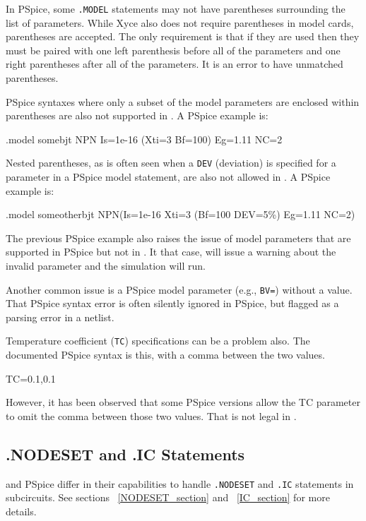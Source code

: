 In PSpice, some \texttt{.MODEL} statements may not have parentheses
surrounding the list of parameters.  While Xyce also does not require parentheses
in model cards, parentheses are accepted.  The only \Xyce{} requirement is that if
they are used then they must be paired with one left parenthesis before all of the
parameters and one right parentheses after all of the parameters. It is an error
to have unmatched parentheses.  

PSpice syntaxes where only a subset of the model 
parameters are enclosed within parentheses are also not supported in \Xyce{}. 
A PSpice example is:
\begin{vquote}
.model somebjt NPN Is=1e-16 (Xti=3 Bf=100) Eg=1.11 NC=2
\end{vquote}

Nested parentheses, as is often seen when a \texttt{DEV} (deviation) is specified 
for a parameter in a PSpice model statement, are also not allowed in \Xyce{}.  A PSpice
example is:
\begin{vquote}
.model someotherbjt NPN(Is=1e-16 Xti=3 (Bf=100 DEV=5\%) Eg=1.11 NC=2)
\end{vquote}

The previous PSpice example also raises the issue of model parameters that are supported
in PSpice but not in \Xyce{}.  It that case, \Xyce{} will issue a warning about the
invalid parameter and the simulation will run.

Another common issue is a PSpice model parameter (e.g., \texttt{BV=}) without a value.  
That PSpice syntax error is often silently ignored in PSpice, but flagged as a parsing 
error in a \Xyce{} netlist.  

Temperature coefficient (\texttt{TC}) specifications can be a problem also.  The 
documented PSpice syntax is this, with a comma between the two values.  

\begin{vquote}
TC=0.1,0.1
\end{vquote}

However, it has been observed that some PSpice versions allow the TC parameter to 
omit the comma between those two values.  That is not legal in \Xyce{}.

\subsection{.NODESET and .IC Statements}
\Xyce{} and PSpice differ in their capabilities to handle \texttt{.NODESET} and 
\texttt{.IC} statements in subcircuits.  See sections ~\ref{NODESET_section} 
and ~\ref{IC_section} for more details.

